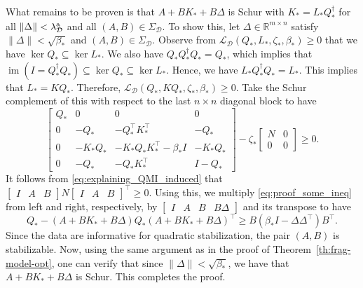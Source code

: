 \documentclass[9pt,shortpaper,twoside,web]{ieeecolor}
\DeclareMathOperator{\im}{im}
\newcommand{\R}{\mathbb{R}}
\begin{document}
What remains to be proven is that $A+BK_*+B\Delta$ is Schur with $K_*=L_*Q_*^{\dagger}$ for all $\|\Delta\|<\lambda_{\mathcal{D}}^\textup{a}$ and all \mbox{$(A,B)\in\Sigma_\mathcal{D}$}. To show this, let $\Delta \in \R^{m \times n}$ satisfy $\|\Delta\|<\sqrt{\beta_*}$ and $(A,B)\in\Sigma_\mathcal{D}$. Observe from $\mathcal{L}_{\mathcal{D}}(Q_*,L_*,\zeta_*,\beta_*)\geq0$ that we have $\ker Q_*\subseteq\ker L_*$. We also have $Q_*Q_*^\dagger Q_*=Q_*$, which implies that \mbox{$\im (I=Q_*^\dagger Q_*)\subseteq \ker Q_*\subseteq \ker L_*$}. Hence, we have \mbox{$L_*Q_*^\dagger Q_*=L_*$}. This implies that $L_*=KQ_*$. Therefore, \mbox{$\mathcal{L}_{\mathcal{D}}(Q_*,KQ_*,\zeta_*,\beta_*)\geq 0$}.
Take the Schur complement of this with respect to the last $n\times n$ diagonal block to have
\begin{equation}
\label{eq:proof_some_ineq}
\begin{bmatrix}
Q_* & 0 & 0 & 0 \\
0 & -Q_* & -Q_*^\top K_*^\top & -Q_* \\
0 & -K_* Q_* & -K_* Q_*K_*^\top \!-\!\beta_* I & -K_*Q_* \\
0 & -Q_* & -Q_* K_*^\top & I-Q_*
\end{bmatrix}\!-\zeta_*\! \begin{bmatrix}
N & 0 \\
0 & 0
\end{bmatrix}\!\geq\! 0.
\end{equation}
It follows from \eqref{eq:explaining_QMI_induced} that $\begin{bmatrix}
I \!\!&\!\! A \!\!&\!\!  B
\end{bmatrix} N\begin{bmatrix}
I \!\!&\!\! A \!\!&\!\!  B
\end{bmatrix}^{\!\top}\!\geq\! 0$. Using this, we multiply \eqref{eq:proof_some_ineq} from left and right, respectively, by $\begin{bmatrix}
I & A & B & B\Delta
\end{bmatrix}$ and its transpose to have
\begin{equation}
Q_*-(A+BK_*+B\Delta)Q_*(A+BK_*+B\Delta)^\top\geq B(\beta_* I-\Delta \Delta ^\top)B^\top.
\end{equation}
Since the data are informative for quadratic stabilization, the pair $(A,B)$ is stabilizable. Now, using the same argument as in the proof of Theorem~\ref{th:frag-model-opt}, one can verify that since $\|\Delta\|<\sqrt{\beta_*}$, we have that $A+BK_*+B\Delta$ is Schur. This completes the proof. \hfill \QED
\end{document}
